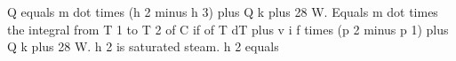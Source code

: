 Q equals m dot times (h 2 minus h 3) plus Q k plus 28 W.  
Equals m dot times the integral from T 1 to T 2 of C if of T dT plus v i f times (p 2 minus p 1) plus Q k plus 28 W.  
h 2 is saturated steam.  
h 2 equals